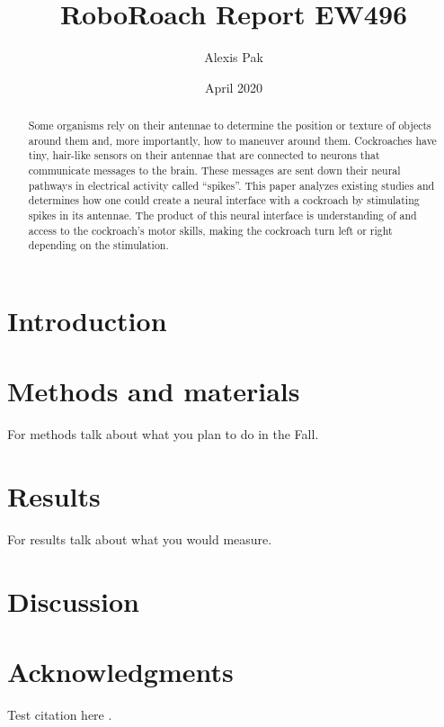 \documentclass{article}
\title{RoboRoach Report EW496}
\author{Alexis Pak}
\date{April 2020}
\begin{document}
\maketitle
\begin{abstract}
Some organisms rely on their antennae to determine the position or texture of objects around them and, more importantly, how to maneuver around them. Cockroaches have tiny, hair-like sensors on their antennae that are connected to neurons that communicate messages to the brain. These messages are sent down their neural pathways in electrical activity called ``spikes''. This paper analyzes existing studies and determines how one could create a neural interface with a cockroach by stimulating spikes in its antennae. The product of this neural interface is understanding of and access to the cockroach's motor skills, making the cockroach turn left or right depending on the stimulation. 
\end{abstract}




\section{Introduction}

\section{Methods and materials}
For methods talk about what you plan to do in the Fall.

\section{Results}
For results talk about what you would measure.

\section{Discussion}

\section{Acknowledgments}
Test citation here \citep{buck2020go}.


\end{document}

